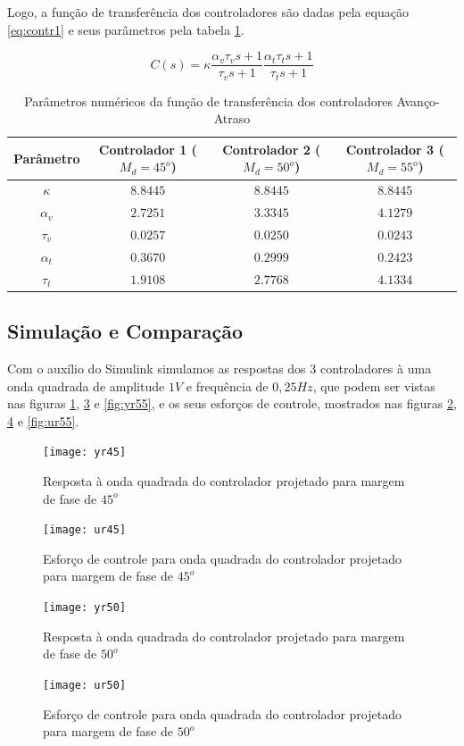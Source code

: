 \documentclass{article}
\begin{document}
Logo, a função de transferência dos controladores são dadas pela equação \ref{eq:contr1} e seus parâmetros pela tabela \ref{tab:contr}.

\begin{equation}
\label{eq:contr}
C(s)=\kappa \frac{\alpha_v \tau_v s + 1}{\tau_v s + 1} \frac{\alpha_t \tau_t s + 1}{\tau_t s + 1}
\end{equation}

\begin{table}[H]
	\centering
	\caption{Parâmetros numéricos da função de transferência dos controladores Avanço-Atraso}
	\label{tab:contr}
	\begin{tabular}{|c|c|c|c|}
		\hline Parâmetro & Controlador 1 ($M_d = 45^o$)& Controlador 2 ($M_d = 50^o$)& Controlador 3 ($M_d = 55^o$)\\ 
		\hline $\kappa$ & $8.8445$ & $8.8445$ & $8.8445$\\ 
		\hline $\alpha_v$ & $2.7251$ & $3.3345$ & $4.1279$\\ 
		\hline $\tau_v$ & $0.0257$ & $0.0250$ & $0.0243$\\ 
		\hline $\alpha_t$ & $0.3670$ & $0.2999$ & $0.2423$\\ 
		\hline $\tau_t$ & $1.9108$ & $2.7768$ & $4.1334$\\ 
		\hline 
	\end{tabular} 
\end{table}

\subsection{Simulação e Comparação}
Com o auxílio do Simulink simulamos as respostas dos 3 controladores à uma onda quadrada de amplitude $1V$ e frequência de $0,25Hz$, que podem ser vistas nas figuras \ref{fig:yr45}, \ref{fig:yr50} e \ref{fig:yr55}, e os seus esforços de controle, mostrados nas figuras \ref{fig:ur45}, \ref{fig:ur50} e \ref{fig:ur55}.
\begin{figure}[H]
	\centering
	\texttt{[image: yr45]}
	\caption{Resposta à onda quadrada do controlador projetado para margem de fase de $45^o$}
	\label{fig:yr45}
\end{figure}
\begin{figure}[H]
	\centering
	\texttt{[image: ur45]}
	\caption{Esforço de controle para onda quadrada do controlador projetado para margem de fase de $45^o$}
	\label{fig:ur45}
\end{figure}

\begin{figure}[H]
	\centering
	\texttt{[image: yr50]}
	\caption{Resposta à onda quadrada do controlador projetado para margem de fase de $50^o$}
	\label{fig:yr50}
\end{figure}
\begin{figure}[H]
	\centering
	\texttt{[image: ur50]}
	\caption{Esforço de controle para onda quadrada do controlador projetado para margem de fase de $50^o$}
	\label{fig:ur50}
\end{figure}
\end{document}
